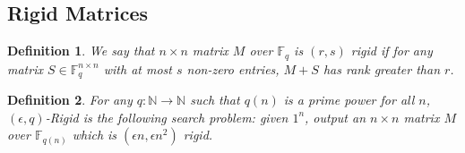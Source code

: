 \documentclass[11pt]{article}
\newtheorem{definition}{Definition}
\begin{document}
\subsection{Rigid Matrices}
\begin{definition}\cite{Valiant}
We say that $n \times n$ matrix $M$ over $\mathbb{F}_q$ is $(r, s)$ rigid if for any matrix $S \in \mathbb{F}_q^{n \times n}$ with at most $s$ non-zero entries, $M+S$ has rank greater than $r$.
\end{definition}

\begin{definition}
For any $q: \mathbb{N} \rightarrow \mathbb{N}$ such that $q(n)$ is a prime power for all $n$, {\sc $(\epsilon, q)$-Rigid} is the following search problem: given $1^n$, output an $n \times n$ matrix $M$ over $\mathbb{F}_{q(n)}$ which is $(\epsilon n, \epsilon n^2)$ rigid.
\end{definition}
\end{document}
